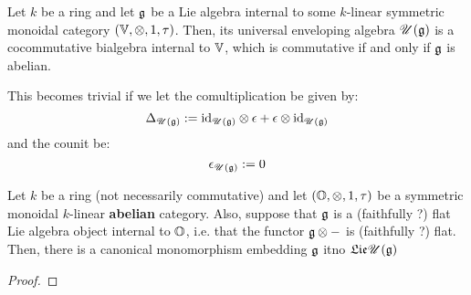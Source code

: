             \begin{remark} \label{remark: universal_enveloping_algebras_are_bialgebras}
                Let $k$ be a ring and let $\mathfrak{g}$ be a Lie algebra internal to some $k$-linear symmetric monoidal category $(\V, \tensor, 1, \tau)$. Then, its universal enveloping algebra $\mathscr{U}(\mathfrak{g})$ is a cocommutative bialgebra internal to $\mathbb{V}$, which is commutative if and only if $\mathfrak{g}$ is abelian. 
                
                This becomes trivial if we let the comultiplication be given by:
                    $$\Delta_{\U(\g)} := \id_{\U(\g)} \tensor \e + \e \tensor \id_{\U(\g)}$$
                and the counit be:
                    $$\epsilon_{\mathscr{U}(\mathfrak{g})} := 0$$
            \end{remark}
                
            \begin{lemma}
                Let $k$ be a ring (not necessarily commutative) and let $(\O, \tensor, 1, \tau)$ be a symmetric monoidal $k$-linear \textbf{abelian} category. Also, suppose that $\mathfrak{g}$ is a (faithfully ?) flat Lie algebra object internal to $\mathbb{O}$, i.e. that the functor $\g \tensor -$ is (faithfully ?) flat. Then, there is a canonical monomorphism embedding $\mathfrak{g}$ itno $\mathfrak{Lie} \mathscr{U}(\mathfrak{g})$
            \end{lemma}
                \begin{proof}
                \end{proof}
            
